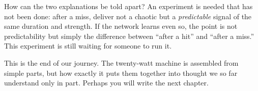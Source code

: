 How can the two explanations be told apart? An experiment is needed that has not been done: after a miss, deliver not a chaotic but a \emph{predictable} signal of the same duration and strength. If the network learns even so, the point is not predictability but simply the difference between ``after a hit'' and ``after a miss.'' This experiment is still waiting for someone to run it.

This is the end of our journey. The twenty-watt machine is assembled from simple parts, but how exactly it puts them together into thought we so far understand only in part. Perhaps you will write the next chapter.

